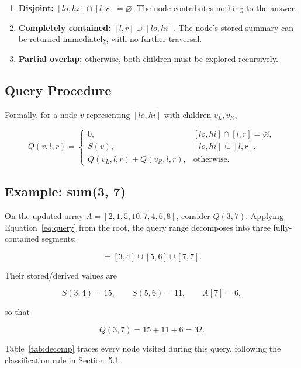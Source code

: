 \documentclass[11pt,open=any,headings=option]{scrreprt}
\begin{document}
\begin{enumerate}[nosep]
  \item \textbf{Disjoint:} $[lo,hi] \cap [l,r] = \varnothing$. The node contributes nothing to the answer.
  \item \textbf{Completely contained:} $[l,r] \supseteq [lo,hi]$. The node's stored summary can be returned immediately, with no further traversal.
  \item \textbf{Partial overlap:} otherwise, both children must be explored recursively.
\end{enumerate}

\subsection{Query Procedure}
Formally, for a node $v$ representing $[lo,hi]$ with children $v_L, v_R$,

\begin{equation}
Q(v,l,r) =
\begin{cases}
0, & [lo,hi] \cap [l,r] = \varnothing, \\[4pt]
S(v), & [lo,hi] \subseteq [l,r], \\[4pt]
Q(v_L,l,r) + Q(v_R,l,r), & \text{otherwise.}
\end{cases}
\label{eq:query}
\end{equation}

\subsection{Example: sum(3, 7)}
On the updated array $A = [2,1,5,10,7,4,6,8]$, consider $Q(3,7)$. Applying Equation~\eqref{eq:query} from the root, the query range decomposes into three fully-contained segments:

\begin{equation}
[3,7] = [3,4] \cup [5,6] \cup [7,7].
\end{equation}

Their stored/derived values are

\begin{equation}
S(3,4) = 15, \qquad S(5,6) = 11, \qquad A[7] = 6,
\end{equation}

so that

\begin{equation}
Q(3,7) = 15 + 11 + 6 = 32.
\end{equation}

Table~\ref{tab:decomp} traces every node visited during this query, following the classification rule in Section~5.1.
\end{document}
